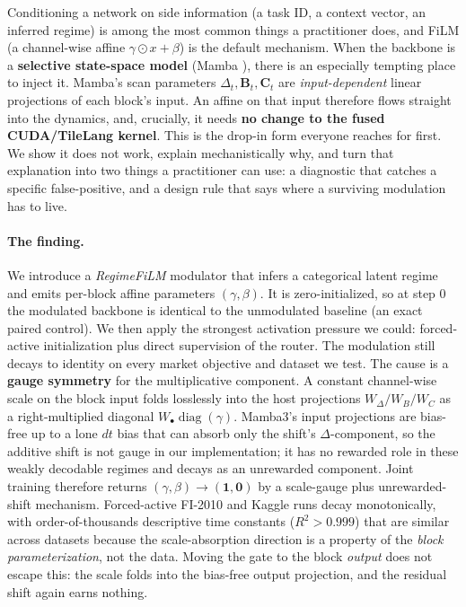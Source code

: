 \documentclass{article}
\DeclareMathOperator{\diagop}{diag}
\newcommand{\diag}{\diagop}
\begin{document}
Conditioning a network on side information (a task ID, a context vector, an
inferred regime) is among the most common things a practitioner does, and FiLM
(a channel-wise affine $\gamma\odot x+\beta$) \citep{perez2018film} is the
default mechanism. When the backbone is a \textbf{selective state-space model}
(Mamba \citep{gu2024mamba}), there is an especially tempting place to inject it.
Mamba's scan parameters $\Delta_t,\mathbf{B}_t,\mathbf{C}_t$ are
\emph{input-dependent} linear projections of each block's input. An affine on that
input therefore flows straight into the dynamics, and, crucially, it needs
\textbf{no change to the fused CUDA/TileLang kernel}. This is the drop-in form
everyone reaches for first. We show it does not work, explain mechanistically why,
and turn that explanation into two things a practitioner can use: a diagnostic that
catches a specific false-positive, and a design rule that says where a surviving
modulation has to live.

\paragraph{The finding.}
We introduce a \emph{RegimeFiLM} modulator that infers a categorical latent
regime and emits per-block affine parameters $(\gamma,\beta)$. It is
zero-initialized, so at step 0 the modulated backbone is identical to the
unmodulated baseline (an exact paired control). We then apply the strongest
activation pressure we could: forced-active initialization plus direct supervision
of the router. The modulation still decays to identity on every market objective
and dataset we test. The cause is a \textbf{gauge symmetry} for the multiplicative
component. A constant channel-wise scale on the block input folds losslessly into
the host projections $W_\Delta/W_B/W_C$ as a right-multiplied diagonal
$W_\bullet\diag(\gamma)$. Mamba3's input projections are bias-free up to a lone
$dt$ bias that can absorb only the shift's $\Delta$-component, so the additive
shift is not gauge in our implementation; it has no rewarded role in these weakly
decodable regimes and decays as an unrewarded component. Joint training therefore
returns $(\gamma,\beta)\to(\mathbf{1},\mathbf{0})$ by a scale-gauge plus
unrewarded-shift mechanism. Forced-active FI-2010 and Kaggle runs decay
monotonically, with order-of-thousands descriptive time constants ($R^2>0.999$)
that are similar across datasets because the scale-absorption direction is a
property of the \emph{block parameterization}, not the data. Moving the gate to the
block \emph{output} does not escape this: the scale folds into the bias-free output
projection, and the residual shift again earns nothing.
\end{document}
